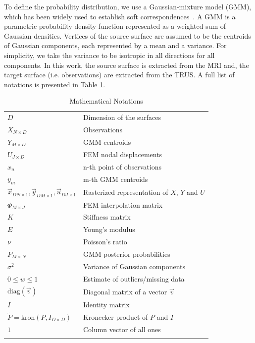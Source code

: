 \documentclass[journal]{IEEEtran}
\newcommand{\comment}[1]{\textcolor{red}{#1}}
\newcommand{\diag}{\mathrm{diag}}
\newcommand{\kron}{\mathrm{kron}}
\begin{document}
To define the probability distribution, we use a Gaussian-mixture model (GMM), which has been widely used to establish soft correspondences~\cite{Myronenko10a,Rasoulian12a,Jian11a}. A GMM is a parametric probability density function represented as a weighted sum of Gaussian densities.  Vertices of the source surface are assumed to be the centroids of Gaussian components, each represented by a mean and a variance. For simplicity, we take the variance to be isotropic in all directions for all components.  In this work, the source surface is extracted from the MRI and, the target surface (i.e. observations) are extracted from the TRUS.  A full list of notations is presented in Table \ref{tbl:notation}.
\begin{table}[!bht]
  \centering
  \caption{Mathematical Notations \label{tbl:notation}}
  \begin{tabular}{lp{}}
  \hline
    $D$ & Dimension of the surfaces\\
    $X_{N\times D}$ & Observations\\
    $Y_{M\times D}$ & GMM centroids\\
    $U_{J\times D}$ & FEM nodal displacements\\
    $x_n$ & n-th point of observations\\
    $y_m$ & m-th GMM centroids\\
    $\vec{x}_{DN \times 1},\vec{y}_{DM \times 1},\vec{u}_{DJ \times 1}$ & Rasterized representation of $X$, $Y$ and $U$\\
    $\Phi_{M\times J}$ & FEM interpolation matrix\\
    $K$ & Stiffness matrix\\
    $E$ & Young's modulus\\
    $\nu$ & Poisson's ratio\\
    $P_{M\times N}$ & GMM posterior probabilities\\ 
    $\sigma^2$ & Variance of Gaussian components\\
    $0{\leq}w{\leq}1$ & Estimate of outliers/missing data\\
    $\diag{(\vec{v})}$ & Diagonal matrix of a vector $\vec{v}$\\
    $I$ & Identity matrix\\
    $\tilde{P} = \kron{(P,I_{D\times{D}})}$ &Kronecker product of $P$ and $I$\\
    $1$ & Column vector of all ones\\
    \hline\\
  \end{tabular}
\end{table}
\end{document}
